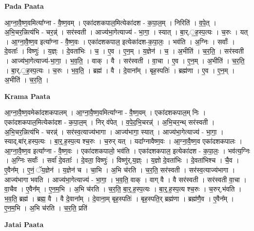 \documentclass[17pt]{extarticle}
\begin{document}
\textbf{Pada Paata} \newline

आ॒ग्ना॒वै॒ष्ण॒वमित्या᳚ग्ना - वै॒ष्ण॒वम् । एका॑दशकपाल॒मित्येका॑दश - क॒पा॒ल॒म् । निरिति॑ । व॒पे॒त् । अ॒भि॒चर॒न्नित्य॑भि - चर॒न्न्॑ । सर॑स्वती । आज्य॑भा॒गेत्याज्य॑ - भा॒गा॒ । स्यात् । बा॒र्.॒ह॒स्प॒त्यः । च॒रुः । यत् । आ॒ग्ना॒वै॒ष्ण॒व इत्या᳚ग्ना - वै॒ष्ण॒वः । एका॑दशकपाल॒ इत्येका॑दश-क॒पा॒लः॒ । भव॑ति । अ॒ग्निः । सर्वाः᳚ । दे॒वताः᳚ । विष्णुः॑ । य॒ज्ञ्ः । दे॒वता॑भिः । च॒ । ए॒व । ए॒न॒म् । य॒ज्ञेन॑ । च॒ । अ॒भीति॑ । च॒र॒ति॒ । सर॑स्वती । आज्य॑भा॒गेत्याज्य॑-भा॒गा॒ । भ॒व॒ति॒ । वाक् । वै । सर॑स्वती । वा॒चा । ए॒व । ए॒न॒म् । अ॒भीति॑ । च॒र॒ति॒ । बा॒र्.॒ह॒स्प॒त्यः । च॒रुः । भ॒व॒ति॒ । ब्रह्म॑ । वै । दे॒वाना᳚म् । बृह॒स्पतिः॑ । ब्रह्म॑णा । ए॒व । ए॒न॒म् । अ॒भीति॑ । च॒र॒ति॒ ।  \newline


\textbf{Krama Paata} \newline

आ॒ग्ना॒वै॒ष्ण॒वमेका॑दशकपालम् । आ॒ग्ना॒वै॒ष्ण॒वमित्या᳚ग्ना - वै॒ष्ण॒वम् । एका॑दशकपाल॒म् निः । एका॑दशकपाल॒मित्येका॑दश - क॒पा॒ल॒म् । निर् व॑पेत् । व॒पे॒द॒भि॒चरन्न्॑ । अ॒भि॒चर॒न्थ् सर॑स्वती । अ॒भि॒चर॒न्नित्य॑भि - चरन्न्॑ । सर॑स्व॒त्याज्य॑भागा । आज्य॑भागा॒ स्यात् । आज्य॑भा॒गेत्याज्य॑ - भा॒गा॒ । स्याद्,बा॑र्.हस्प॒त्यः । बा॒र्॒.ह॒स्प॒त्य श्च॒रुः । च॒रुर् यत् । यदा᳚ग्नावैष्ण॒वः । आ॒ग्ना॒वै॒ष्ण॒व एका॑दशकपालः । आ॒ग्ना॒वै॒ष्ण॒व इत्या᳚ग्ना - वै॒ष्ण॒वः । एका॑दशकपालो॒ भव॑ति । एका॑दशकपाल॒ इत्येका॑दश - क॒पा॒लः॒ । भव॑त्य॒ग्निः । अ॒ग्निः सर्वाः᳚ । सर्वा॑ दे॒वताः᳚ । दे॒वता॒ विष्णुः॑ । विष्णु॑र्,य॒ज्ञ्ः । य॒ज्ञो दे॒वता॑भिः । दे॒वता॑भिश्च । चै॒व । ए॒वैन᳚म् । ए॒नं॒ ॅय॒ज्ञेन॑ । य॒ज्ञेन॑ च । चा॒भि । अ॒भि च॑रति । च॒र॒ति॒ सर॑स्वती । सर॑स्व॒त्याज्य॑भागा । आज्य॑भागा भवति । आज्य॑भा॒गेत्याज्य॑ - भा॒गा॒ । भ॒व॒ति॒ वाक् । वाग् वै । वै सर॑स्वती । सर॑स्वती वा॒चा । वा॒चैव । ए॒वैन᳚म् । ए॒न॒म॒भि । अ॒भि च॑रति । च॒र॒ति॒ बा॒र्॒.ह॒स्प॒त्यः । बा॒र्॒.ह॒स्प॒त्य श्च॒रुः । च॒रुर्,भ॑वति । भ॒व॒ति॒ ब्रह्म॑ । ब्रह्म॒ वै । वै दे॒वाना᳚म् । दे॒वाना॒म् बृह॒स्पतिः॑ । बृह॒स्पति॒र् ब्रह्म॑णा । ब्रह्म॑णै॒व । ए॒वैन᳚म् । ए॒न॒म॒भि । अ॒भि च॑रति । च॒र॒ति॒ प्रति॑ \newline

\textbf{Jatai Paata} \newline
\end{document}
